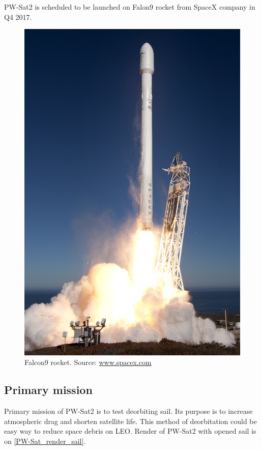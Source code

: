	PW-Sat2 is scheduled to be launched on Falon9 rocket from SpaceX company in Q4 2017.
	
	\begin{figure}[H]
		\centering
		\includegraphics[width=0.3\paperwidth]{img/Falcon9.jpg}
		\caption{Falcon9 rocket. Source: \url{www.spacex.com}}
		\label{PW-Sat_render_01}
	\end{figure}
	
	
\subsection{Primary mission}
	Primary mission of PW-Sat2 is to test deorbiting sail. Its purpose is to increase atmospheric drag and shorten satellite life. This method of deorbitation could be easy way to reduce space debris on LEO. Render of PW-Sat2 with opened sail is on \ref{PW-Sat_render_sail}.
	
